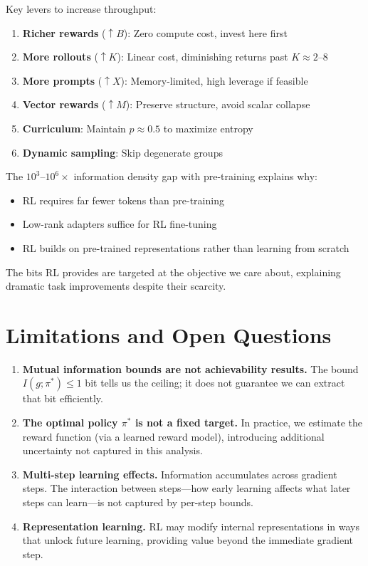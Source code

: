 \documentclass[11pt,a4paper]{article}
\theoremstyle{definition}
\theoremstyle{remark}
\begin{document}
Key levers to increase throughput:
\begin{enumerate}
    \item \textbf{Richer rewards} ($\uparrow B$): Zero compute cost, invest here first
    \item \textbf{More rollouts} ($\uparrow K$): Linear cost, diminishing returns past $K \approx 2$--8
    \item \textbf{More prompts} ($\uparrow X$): Memory-limited, high leverage if feasible
    \item \textbf{Vector rewards} ($\uparrow M$): Preserve structure, avoid scalar collapse
    \item \textbf{Curriculum}: Maintain $p \approx 0.5$ to maximize entropy
    \item \textbf{Dynamic sampling}: Skip degenerate groups
\end{enumerate}

The $10^3$--$10^6\times$ information density gap with pre-training explains why:
\begin{itemize}
    \item RL requires far fewer tokens than pre-training
    \item Low-rank adapters suffice for RL fine-tuning
    \item RL builds on pre-trained representations rather than learning from scratch
\end{itemize}

The bits RL provides are targeted at the objective we care about, explaining dramatic task improvements despite their scarcity.

\section*{Limitations and Open Questions}

\begin{enumerate}
    \item \textbf{Mutual information bounds are not achievability results.} The bound $I(g; \pi^*) \leq 1$ bit tells us the ceiling; it does not guarantee we can extract that bit efficiently.

    \item \textbf{The optimal policy $\pi^*$ is not a fixed target.} In practice, we estimate the reward function (via a learned reward model), introducing additional uncertainty not captured in this analysis.

    \item \textbf{Multi-step learning effects.} Information accumulates across gradient steps. The interaction between steps---how early learning affects what later steps can learn---is not captured by per-step bounds.

    \item \textbf{Representation learning.} RL may modify internal representations in ways that unlock future learning, providing value beyond the immediate gradient step.
\end{enumerate}
\end{document}
